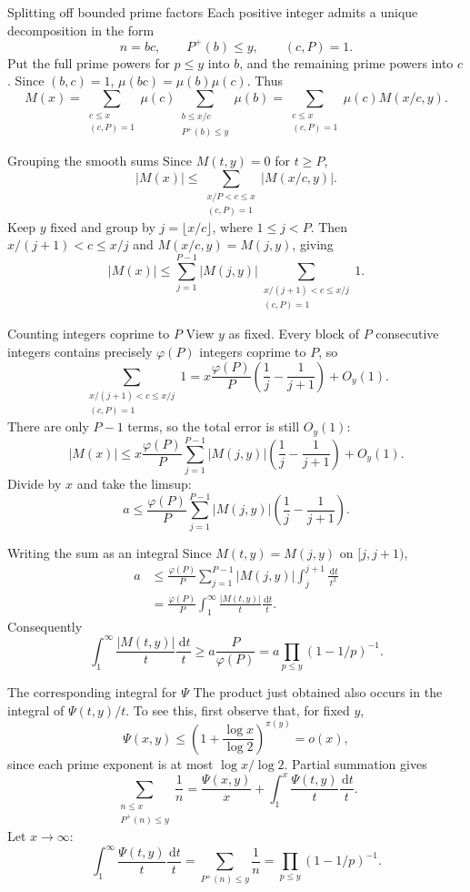 \documentclass[aspectratio=169,11pt]{beamer}
\newcommand{\dd}{\,\mathrm d}
\begin{document}
\begin{frame}{Splitting off bounded prime factors}
Each positive integer admits a unique decomposition in the form
\[n=bc,\qquad P^+(b)\le y,\qquad(c,P)=1.\]
Put the full prime powers for $p\le y$ into $b$, and the remaining prime powers into $c$. Since $(b,c)=1$, $\mu(bc)=\mu(b)\mu(c)$. Thus
\[M(x)=\sum_{\substack{c\le x\\(c,P)=1}}\mu(c)
\sum_{\substack{b\le x/c\\P^+(b)\le y}}\mu(b)
=\sum_{\substack{c\le x\\(c,P)=1}}\mu(c)M(x/c,y).\]
\end{frame}
\begin{frame}{Grouping the smooth sums}
Since $M(t,y)=0$ for $t\ge P$,
\[|M(x)|\le\sum_{\substack{x/P<c\le x\\(c,P)=1}}|M(x/c,y)|.\]
Keep $y$ fixed and group by $j=\lfloor x/c\rfloor$, where $1\le j<P$. Then $x/(j+1)<c\le x/j$ and $M(x/c,y)=M(j,y)$, giving
\[|M(x)|\le\sum_{j=1}^{P-1}|M(j,y)|
\sum_{\substack{x/(j+1)<c\le x/j\\(c,P)=1}}1.\]
\end{frame}
\begin{frame}{Counting integers coprime to $P$}
\small
View $y$ as fixed. Every block of $P$ consecutive integers contains precisely $\varphi(P)$ integers coprime to $P$, so
\[\sum_{\substack{x/(j+1)<c\le x/j\\(c,P)=1}}1
=x\frac{\varphi(P)}P\left(\frac1j-\frac1{j+1}\right)+O_y(1).\]
There are only $P-1$ terms, so the total error is still $O_y(1)$:
\[|M(x)|\le x\frac{\varphi(P)}P\sum_{j=1}^{P-1}|M(j,y)|\left(\frac1j-\frac1{j+1}\right)+O_y(1).\]
Divide by $x$ and take the limsup:
\[a\le\frac{\varphi(P)}P\sum_{j=1}^{P-1}|M(j,y)|\left(\frac1j-\frac1{j+1}\right).\]
\end{frame}
\begin{frame}{Writing the sum as an integral}
Since $M(t,y)=M(j,y)$ on $[j,j+1)$,
\begin{align*}
a&\le\frac{\varphi(P)}P\sum_{j=1}^{P-1}|M(j,y)|\int_j^{j+1}\frac{\dd t}{t^2}\\
&=\frac{\varphi(P)}P\int_1^\infty\frac{|M(t,y)|}t\frac{\dd t}t.
\end{align*}
Consequently
\[\int_1^\infty\frac{|M(t,y)|}t\frac{\dd t}t\ge a\frac P{\varphi(P)}
=a\prod_{p\le y}(1-1/p)^{-1}.\]
\end{frame}
\begin{frame}{The corresponding integral for $\Psi$}
The product just obtained also occurs in the integral of $\Psi(t,y)/t$. To see this, first observe that, for fixed $y$,
\[\Psi(x,y)\le\left(1+\frac{\log x}{\log2}\right)^{\pi(y)}=o(x),\]
since each prime exponent is at most $\log x/\log2$. Partial summation gives
\[\sum_{\substack{n\le x\\P^+(n)\le y}}\frac1n
=\frac{\Psi(x,y)}x+\int_1^x\frac{\Psi(t,y)}t\frac{\dd t}t.\]
Let $x\to\infty$:
\[\int_1^\infty\frac{\Psi(t,y)}t\frac{\dd t}t
=\sum_{P^+(n)\le y}\frac1n=\prod_{p\le y}(1-1/p)^{-1}.\]
\end{frame}
\end{document}
